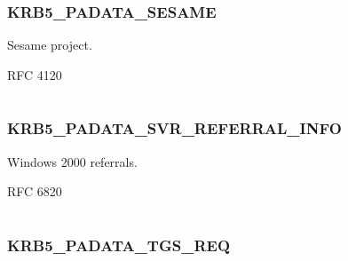 \documentclass[letterpaper,10pt,english]{sphinxmanual}
\begin{document}
\subsubsection{KRB5\_PADATA\_SESAME}
\label{appdev/refs/macros/KRB5_PADATA_SESAME::doc}\label{appdev/refs/macros/KRB5_PADATA_SESAME:krb5-padata-sesame}\label{appdev/refs/macros/KRB5_PADATA_SESAME:krb5-padata-sesame-data}

\begin{fulllineitems}
\label{appdev/refs/macros/KRB5_PADATA_SESAME:KRB5_PADATA_SESAME}
\end{fulllineitems}


Sesame project.

RFC 4120

\begin{tabulary}{\linewidth}{|L|L|}
\hline

 & 
\\\hline
\end{tabulary}



\subsubsection{KRB5\_PADATA\_SVR\_REFERRAL\_INFO}
\label{appdev/refs/macros/KRB5_PADATA_SVR_REFERRAL_INFO::doc}\label{appdev/refs/macros/KRB5_PADATA_SVR_REFERRAL_INFO:krb5-padata-svr-referral-info}\label{appdev/refs/macros/KRB5_PADATA_SVR_REFERRAL_INFO:krb5-padata-svr-referral-info-data}

\begin{fulllineitems}
\label{appdev/refs/macros/KRB5_PADATA_SVR_REFERRAL_INFO:KRB5_PADATA_SVR_REFERRAL_INFO}
\end{fulllineitems}


Windows 2000 referrals.

RFC 6820

\begin{tabulary}{\linewidth}{|L|L|}
\hline

 & 
\\\hline
\end{tabulary}



\subsubsection{KRB5\_PADATA\_TGS\_REQ}
\label{appdev/refs/macros/KRB5_PADATA_TGS_REQ::doc}\label{appdev/refs/macros/KRB5_PADATA_TGS_REQ:krb5-padata-tgs-req}\label{appdev/refs/macros/KRB5_PADATA_TGS_REQ:krb5-padata-tgs-req-data}
\end{document}
